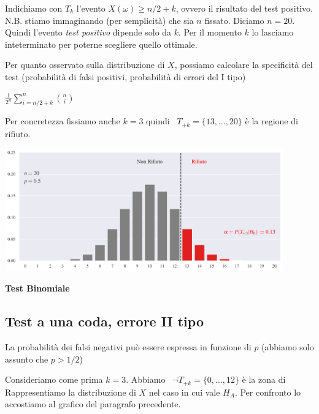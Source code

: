 \documentclass[11pt,openany]{book}
\def\emph#1{\textcolor{blue}{\textbf{\boldmath #1}}}
\renewcommand*{\emph}[1]{%
   \smash{\tikz[baseline]\node[rectangle, fill=teal!25, rounded corners, inner xsep=0.5ex, inner ysep=0.2ex, anchor=base, minimum height = 2.7ex]{#1};}}
\begin{document}
Indichiamo con $T_k$ l'evento $X(\omega)\ge n/2+k$, ovvero il risultato del test positivo. 
N.B. stiamo immaginando (per semplicità) che sia $n$ fissato.  
Diciamo $n=20$. 
Quindi l'evento \textit{test positivo} dipende solo da $k$.
Per il momento $k$ lo lasciamo inteterminato per poterne scegliere quello ottimale.

Per quanto osservato sulla distribuzione di $X$, possiamo calcolare la specificità del test (probabilità di falsi positivi, probabilità di errori del I tipo)



\medrel{=}$\displaystyle\frac1{2^n}\sum^n_{i=n/2+k} {n\choose i}$


Per concretezza fissiamo anche $k=3$ quindi {\color{red}\boldmath\ $T_{+k}=\{13,\dots,20\}$} è la regione di rifiuto.  %


\hfil\includegraphics[width=0.9\textwidth]{figure/B-test_01.pdf}


\clearpage\hfill\textbf{Test Binomiale}\subsection{Test a una coda, errore II tipo}

La probabilità dei falsi negativi può essere espressa in funzione di $p$ (abbiamo solo assunto che $p>1/2$)



Consideriamo come prima $k=3$.
Abbiamo {\color{blue}\boldmath\ $\neg T_{+k}=\{0,\dots,12\}$} è la zona di \emph{NON rifiuto.}
Rappresentiamo la distribuzione di $X$ nel caso in cui vale $H_{A}$. Per confronto lo accostiamo al grafico del paragrafo precedente. 
\end{document}
